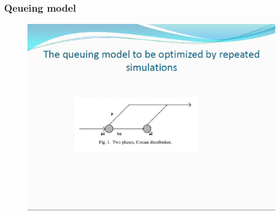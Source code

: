 \documentclass{beamer}
\begin{document}
\begin{frame}
\frametitle{ Qeueing model}
\begin{figure}[!th]
\begin{center}
\includegraphics[width=1\textwidth]{img/pic4.eps}
\end{center}
\end{figure}
\end{frame}
\end{document}
